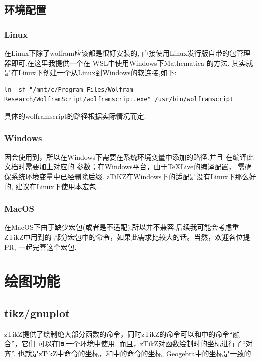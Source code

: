 \subsection{环境配置}
\subsubsection{Linux}
在Linux下除了wolfram应该都是很好安装的, 直接使用Linux发行版自带的包管理器即可.在这里我提供一个在
WSL中使用Windows下Mathematica 的方法. 其实就是在Linux下创建一个从Linux到Windows的软连接,如下:

\begin{verbatim}
ln -sf "/mnt/c/Program Files/Wolfram Research/WolframScript/wolframscript.exe" /usr/bin/wolframscript    
\end{verbatim}

具体的wolframscript的路径根据实际情况而定.

\subsubsection{Windows}
因会使用到，所以在Windows下需要在系统环境变量中添加的路径.并且
在编译此文档时需要加上对应的 参数；在Windows平台，由于\TeX{}Live的编译配置，
需确保系统环境变量中已经删除后缀. zTiKZ在Windows下的适配是没有Linux下那么好的,
建议在Linux下使用本宏包..

\subsubsection{MacOS}
在MacOS下由于缺少宏包(或者是不适配),所以并不兼容.后续我可能会考虑重ZTikZ中用到的
部分宏包中的命令，如果此需求比较大的话。当然，欢迎各位提 PR, 一起完善这个宏包.

\section{绘图功能}
\subsection{tikz/gnuplot}
zTikZ提供了绘制绝大部分函数的命令，同时zTikZ的命令可以和中的命令``融合''，它们
可以在同一个环境中使用. 而且，zTikZ对函数绘制时的坐标进行了``对齐''. 
也就是zTikZ中命令的坐标，和中的命令的坐标, Geogebra中的坐标是一致的. 

